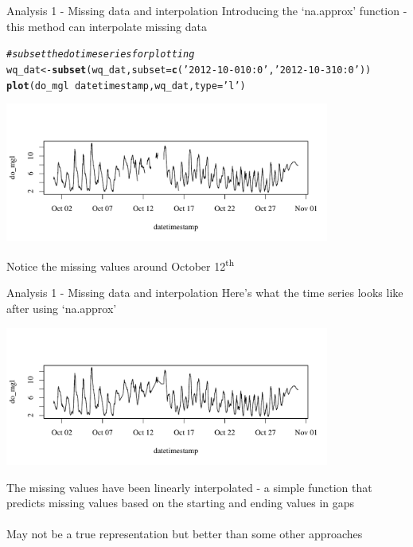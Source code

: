 \documentclass[xcolor=svgnames]{beamer}\usepackage[]{graphicx}\usepackage[]{color}
\makeatletter
\newcommand{\hlstr}[1]{\textcolor[rgb]{0.192,0.494,0.8}{#1}}%
\newcommand{\hlcom}[1]{\textcolor[rgb]{0.678,0.584,0.686}{\textit{#1}}}%
\newcommand{\hlopt}[1]{\textcolor[rgb]{0,0,0}{#1}}%
\newcommand{\hlstd}[1]{\textcolor[rgb]{0.345,0.345,0.345}{#1}}%
\newcommand{\hlkwb}[1]{\textcolor[rgb]{0.69,0.353,0.396}{#1}}%
\newcommand{\hlkwc}[1]{\textcolor[rgb]{0.333,0.667,0.333}{#1}}%
\newcommand{\hlkwd}[1]{\textcolor[rgb]{0.737,0.353,0.396}{\textbf{#1}}}%
\newenvironment{kframe}{%
 \def\at@end@of@kframe{}%
 \ifinner\ifhmode%
  \def\at@end@of@kframe{\end{minipage}}%
  \begin{minipage}{\columnwidth}%
 \fi\fi%
 \def\FrameCommand##1{\hskip\@totalleftmargin \hskip-\fboxsep
 \colorbox{shadecolor}{##1}\hskip-\fboxsep
     \hskip-\linewidth \hskip-\@totalleftmargin \hskip\columnwidth}%
 \MakeFramed {\advance\hsize-\width
   \@totalleftmargin\z@ \linewidth\hsize
   \@setminipage}}%
 {\par\unskip\endMakeFramed%
 \at@end@of@kframe}
\newenvironment{knitrout}{}{} %
\makeatother
\begin{document}
\begin{frame}[containsverbatim]{Analysis 1 - Missing data and interpolation}
Introducing the `na.approx' function - this method can interpolate missing data
\begin{knitrout}\scriptsize
{}\color{fgcolor}\begin{kframe}
\begin{alltt}
\hlcom{# subset the do time series for plotting}
\hlstd{wq_dat} \hlkwb{<-} \hlkwd{subset}\hlstd{(wq_dat,} \hlkwc{subset} \hlstd{=} \hlkwd{c}\hlstd{(}\hlstr{'2012-10-01 0:0'}\hlstd{,} \hlstr{'2012-10-31 0:0'}\hlstd{))}
\hlkwd{plot}\hlstd{(do_mgl} \hlopt{~} \hlstd{datetimestamp, wq_dat,} \hlkwc{type} \hlstd{=} \hlstr{'l'}\hlstd{)}
\end{alltt}
\end{kframe}

{\centering \includegraphics[width=0.8\textwidth]{figure/unnamed-chunk-4} 

}



\end{knitrout}
Notice the missing values around October 12\textsuperscript{th}
\end{frame}

\begin{frame}[containsverbatim]{Analysis 1 - Missing data and interpolation}
Here's what the time series looks like after using `na.approx'
\begin{knitrout}\scriptsize
{}\color{fgcolor}

{\centering \includegraphics[width=0.8\textwidth]{figure/unnamed-chunk-5} 

}



\end{knitrout}
The missing values have been linearly interpolated - a simple function that predicts missing values based on the starting and ending values in gaps\\~\\
May not be a true representation but better than some other approaches
\end{frame}
\end{document}
